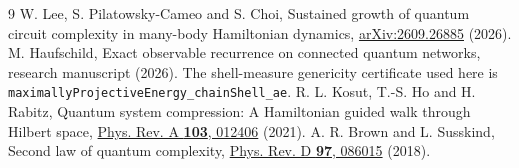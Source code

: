 \documentclass[11pt]{article}
\begin{document}
\begin{thebibliography}{9}
 W. Lee, S. Pilatowsky-Cameo and S. Choi, Sustained growth of quantum circuit complexity in many-body Hamiltonian dynamics, \href{https://arxiv.org/abs/2609.26885}{arXiv:2609.26885} (2026).
 M. Haufschild, Exact observable recurrence on connected quantum networks, research manuscript (2026). The shell-measure genericity certificate used here is \texttt{maximallyProjectiveEnergy\_chainShell\_ae}.
 R. L. Kosut, T.-S. Ho and H. Rabitz, Quantum system compression: A Hamiltonian guided walk through Hilbert space, \href{https://doi.org/10.1103/PhysRevA.103.012406}{Phys. Rev. A \textbf{103}, 012406} (2021).
 A. R. Brown and L. Susskind, Second law of quantum complexity, \href{https://doi.org/10.1103/PhysRevD.97.086015}{Phys. Rev. D \textbf{97}, 086015} (2018).
\end{thebibliography}
\end{document}
